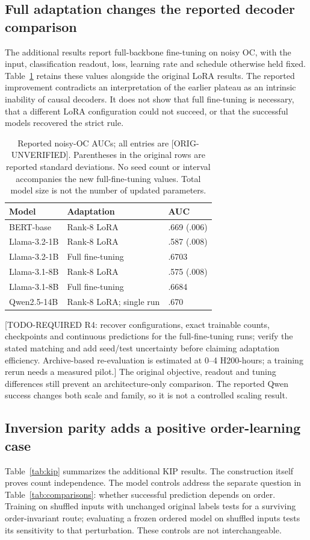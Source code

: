 \documentclass[10pt]{article}
\newcommand{\prov}[1]{{\color{black!65}\scriptsize[#1]}}
\newcommand{\ou}{\prov{ORIG-UNVERIFIED}}
\newcommand{\req}[2]{{\color{brown!75!black}\small[TODO-REQUIRED #1: #2]}}
\begin{document}
\subsection{Full adaptation changes the reported decoder comparison}
\label{sec:adaptation}
The additional results report full-backbone fine-tuning on noisy OC, with the input, classification readout, loss, learning rate and schedule otherwise held fixed. Table~\ref{tab:adaptation} retains these values alongside the original LoRA results. The reported improvement contradicts an interpretation of the earlier plateau as an intrinsic inability of causal decoders. It does not show that full fine-tuning is necessary, that a different LoRA configuration could not succeed, or that the successful models recovered the strict rule.

\begin{table}[H]
\centering\small
\caption{Reported noisy-OC AUCs; all entries are \ou. Parentheses in the original rows are reported standard deviations. No seed count or interval accompanies the new full-fine-tuning values. Total model size is not the number of updated parameters.}
\label{tab:adaptation}
\begin{tabular}{@{}lll@{}}\toprule
Model & Adaptation & AUC \\\midrule
BERT-base & Rank-8 LoRA & .669 (.006) \\
Llama-3.2-1B & Rank-8 LoRA & .587 (.008) \\
Llama-3.2-1B & Full fine-tuning & .6703 \\
Llama-3.1-8B & Rank-8 LoRA & .575 (.008) \\
Llama-3.1-8B & Full fine-tuning & .6684 \\
Qwen2.5-14B & Rank-8 LoRA; single run & .670 \\
\bottomrule\end{tabular}
\end{table}

\req{R4}{recover configurations, exact trainable counts, checkpoints and continuous predictions for the full-fine-tuning runs; verify the stated matching and add seed/test uncertainty before claiming adaptation efficiency. Archive-based re-evaluation is estimated at 0--4 H200-hours; a training rerun needs a measured pilot.} The original objective, readout and tuning differences still prevent an architecture-only comparison. The reported Qwen success changes both scale and family, so it is not a controlled scaling result.

\subsection{Inversion parity adds a positive order-learning case}
Table~\ref{tab:kip} summarizes the additional KIP results. The construction itself proves count independence. The model controls address the separate question in Table~\ref{tab:comparisons}: whether successful prediction depends on order. Training on shuffled inputs with unchanged original labels tests for a surviving order-invariant route; evaluating a frozen ordered model on shuffled inputs tests its sensitivity to that perturbation. These controls are not interchangeable.
\end{document}
